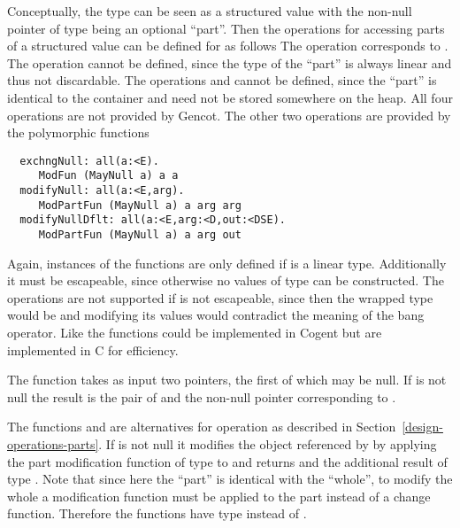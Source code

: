 Conceptually, the type  can be seen as a structured value with the non-null pointer of type  being
an optional ``part''. Then the operations for accessing parts of a structured value can be defined for  as follows
The operation  corresponds to . The operation  cannot be defined, since the type  of the 
``part'' is always linear and thus not discardable. The operations  and  cannot be defined, since
the ``part'' is identical to the container and need not be stored somewhere on the heap. 
All four operations are not provided by Gencot. The other two operations are provided
by the polymorphic functions
\begin{verbatim}
  exchngNull: all(a:<E).
     ModFun (MayNull a) a a
  modifyNull: all(a:<E,arg).
     ModPartFun (MayNull a) a arg arg
  modifyNullDflt: all(a:<E,arg:<D,out:<DSE).
     ModPartFun (MayNull a) a arg out
\end{verbatim}
Again, instances of the functions are only defined if  is a linear type. Additionally it must be escapeable, since
otherwise no values of type  can be constructed. The operations are not supported if  is not 
escapeable, since then the wrapped type would be  and modifying its values would contradict the 
meaning of the bang operator. Like  the functions could be 
implemented in Cogent but are implemented in C for efficiency.

The function  takes as input two pointers, the first of which may be null. If  is not null 
the result is the pair of  and the non-null pointer corresponding to .

The functions  and  are
alternatives for operation  as described in Section~\ref{design-operations-parts}.
If  is not null it modifies the object referenced by  by applying the part modification function  of type 
 to  and returns  and the additional result of type . Note that since here
the ``part'' is identical with the ``whole'', to modify the whole a modification function must be applied to the part instead of
a change function. Therefore the functions have type  instead of .

